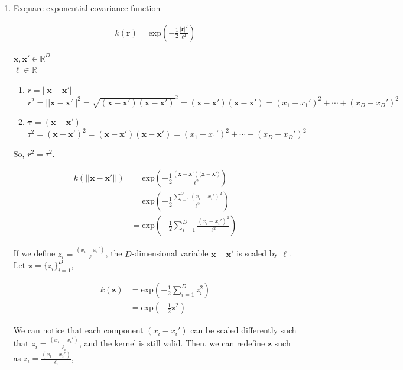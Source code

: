 \documentclass[]{interact}
\theoremstyle{plain}%
\theoremstyle{definition}
\theoremstyle{remark}
\begin{document}
\begin{enumerate}
\item Exquare exponential covariance function 

	\begin{align*}
	k(\mathbf{r})= \mathrm{exp}(-\frac{1}{2} \frac{|\mathbf{r}|^2}{\ell^2})
	\end{align*}

	\noindent $\mathbf{x}, \mathbf{x}' \in \mathbb{R}^D$\\
	$\ell \in \mathbb{R}$\\
	
	\begin{enumerate}
	\item
	$r=||\mathbf{x}-\mathbf{x}'||$\\	
	$r^2=||\mathbf{x}-\mathbf{x}'||^2= \sqrt{(\mathbf{x}-\mathbf{x}')(\mathbf{x}-\mathbf{x}')}^2= (\mathbf{x}-\mathbf{x}')(\mathbf{x}-\mathbf{x}')= (x_1-x_1')^2+\cdots+(x_D-x_D')^2$\\
	\item
	$\boldsymbol{\tau}=(\mathbf{x}-\mathbf{x}')$\\
	$\tau^2=(\mathbf{x}-\mathbf{x}')^2= (\mathbf{x}-\mathbf{x}')(\mathbf{x}-\mathbf{x}')=(x_1-x_1')^2+\cdots+(x_D-x_D')^2$\\
	
	\end{enumerate}
	
	So, $r^2=\tau^2$.

	\begin{align*}
	k(||\mathbf{x}-\mathbf{x}'||) &= \mathrm{exp}\left(-\frac{1}{2} \frac{(\mathbf{x}-\mathbf{x}')\dot (\mathbf{x}-\mathbf{x}')}{\ell^2} \right) \\
	&= \mathrm{exp}\left(-\frac{1}{2} \frac{\sum_{i=1}^{D}(x_i-x_i')^2}{\ell^2} \right) \\
	&=\mathrm{exp}\left(-\frac{1}{2} \sum_{i=1}^{D}\frac{(x_i-x_i')^2}{\ell^2} \right)
	\end{align*}
	
	If we define $z_i=\frac{(x_i-x_i')}{\ell}$, the $D$-dimensional variable $\mathbf{x}-\mathbf{x}'$ is scaled by $\ell$. Let $\mathbf{z}=\{z_i\}_{i=1}^D$,
	
	\begin{align*}
	k(\mathbf{z}) &=\mathrm{exp}\left(-\frac{1}{2} \sum_{i=1}^{D}z_i^2 \right)\\
	&=\mathrm{exp}\left(-\frac{1}{2} \mathbf{z}^2 \right)
	\end{align*}
	
	We can notice that each component $(x_i-x_i')$ can be scaled differently such that $z_i=\frac{(x_i-x_i')}{\ell_i}$, and the kernel is still valid. Then, we can redefine $\mathbf{z}$ such as $z_i=\frac{(x_i-x_i')}{\ell_i}$,
	

\end{enumerate}
\end{document}
